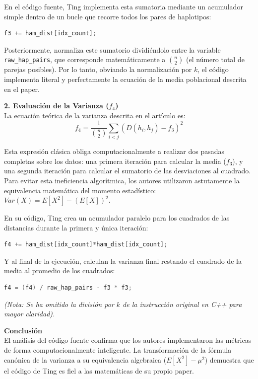 \documentclass[11pt,a4paper]{article}
\begin{document}
En el código fuente, Ting implementa esta sumatoria mediante un acumulador simple dentro de un bucle que recorre todos los pares de haplotipos:
\begin{lstlisting}[language=C++, keywordstyle=\color{blue}, commentstyle=\color{codegreen}, stringstyle=\color{red}, breaklines=true]
f3 += ham_dist[idx_count];
\end{lstlisting}
Posteriormente, normaliza este sumatorio dividiéndolo entre la variable \texttt{raw\_hap\_pairs}, que corresponde matemáticamente a $\binom{n}{2}$ (el número total de parejas posibles). Por lo tanto, obviando la normalización por $k$, el código implementa literal y perfectamente la ecuación de la media poblacional descrita en el paper.

\textbf{2. Evaluación de la Varianza ($f_4$)}\\
La ecuación teórica de la varianza descrita en el artículo es:
$$f_4 = \frac{1}{\binom{n}{2}} \sum_{i<j} \left( D(h_i, h_j) - f_3 \right)^2$$

Esta expresión clásica obliga computacionalmente a realizar dos pasadas completas sobre los datos: una primera iteración para calcular la media ($f_3$), y una segunda iteración para calcular el sumatorio de las desviaciones al cuadrado. 
Para evitar esta ineficiencia algorítmica, los autores utilizaron astutamente la equivalencia matemática del momento estadístico: $Var(X) = E[X^2] - (E[X])^2$.

En su código, Ting crea un acumulador paralelo para los cuadrados de las distancias durante la primera y única iteración:
\begin{lstlisting}[language=C++, keywordstyle=\color{blue}, commentstyle=\color{codegreen}, stringstyle=\color{red}, breaklines=true]
f4 += ham_dist[idx_count]*ham_dist[idx_count];
\end{lstlisting}
Y al final de la ejecución, calculan la varianza final restando el cuadrado de la media al promedio de los cuadrados:
\begin{lstlisting}[language=C++, keywordstyle=\color{blue}, commentstyle=\color{codegreen}, stringstyle=\color{red}, breaklines=true]
f4 = (f4) / raw_hap_pairs - f3 * f3;
\end{lstlisting}
\textit{(Nota: Se ha omitido la división por $k$ de la instrucción original en C++ para mayor claridad).}

\textbf{Conclusión}\\
El análisis del código fuente confirma que los autores implementaron las métricas de forma computacionalmente inteligente. La transformación de la fórmula canónica de la varianza a su equivalencia algebraica ($E[X^2] - \mu^2$) demuestra que el código de Ting es fiel a las matemáticas de su propio paper.
\end{document}
